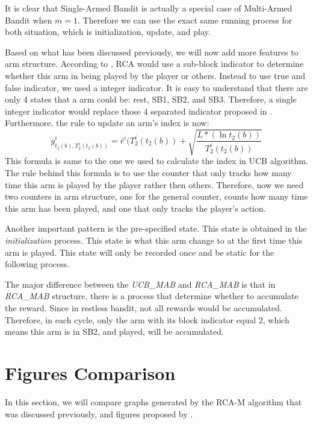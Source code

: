 \documentclass{article}
\begin{document}
It is clear that Single-Armed Bandit is actually a special case of Multi-Armed Bandit when $\textit{m} = 1$. Therefore we can use the exact same running process for both situation, which is initialization, update, and play.

Based on what has been discussed previously, we will now add more features to arm structure. According to \cite{rca}, RCA would use a sub-block indicator to determine whether this arm in being played by the player or others. Instead to use true and false indicator, we used a integer indicator. It is easy to understand that there are only 4 states that a arm could be: rest, SB1, SB2, and SB3. Therefore, a single integer indicator would replace those 4 separated indicator proposed in \cite{rca}. Furthermore, the rule to update an arm's index is now: $$g_{t_{2}(b), T_{2}^{i}(t_{2}(b))}^{i} = \bar{r}^{i}(T_{2}^{i}(t_{2}(b))+\sqrt{\frac{L*(\ln t_{2}(b))}{T_{2}^{i}(t_{2}(b))}}$$
This formula is same to the one we used to calculate the index in UCB algorithm. The rule behind this formula is to use the counter that only tracks how many time this arm is played by the player rather then others. 
Therefore, now we need two counters in arm structure, one for the general counter, counts how many time this arm has been played, and one that only tracks the player's action.

Another important pattern is the pre-specified state. This state is obtained in the \textit{initialization} process. This state is what this arm change to at the first time this arm is played. This state will only be recorded once and be static for the following process.

The major difference between the \textit{UCB\_MAB} and \textit{RCA\_MAB} is that in \textit{RCA\_MAB} structure, there is a process that determine whether to accumulate the reward. Since in restless bandit, not all rewards would be accumulated. Therefore, in each cycle, only the arm with its block indicator equal 2, which means this arm is in SB2, and played, will be accumulated.

\section{Figures Comparison}
In this section, we will compare graphs generated by the RCA-M algorithm that was discussed previously, and figures proposed by \cite{6200864}.
\end{document}
